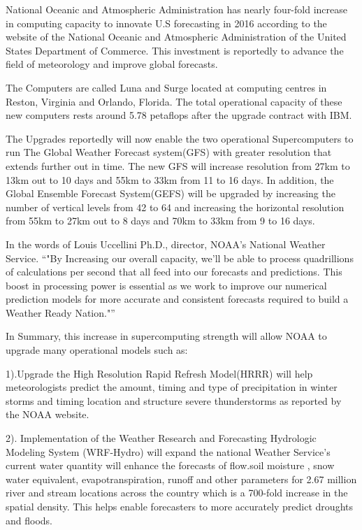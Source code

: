 \documentclass[fleqn,letterpaper,12pt]{report}
\begin{document}
%
\newpage
{}
{}
\problem
National Oceanic and Atmospheric Administration has nearly four-fold increase in computing capacity to innovate U.S forecasting in 2016 according to the website of the National Oceanic and Atmospheric Administration of the United States Department of Commerce. This investment is reportedly to advance the field of meteorology and improve global forecasts.

The Computers are called Luna and Surge located at computing centres in Reston, Virginia and Orlando, Florida. The total operational capacity of these new computers rests around 5.78 petaflops after the upgrade contract with IBM.\cite{latest}

The Upgrades reportedly will now enable the two operational Supercomputers to run The Global Weather Forecast system(GFS) with greater resolution that extends further out in time. The new GFS will increase resolution from 27km to 13km out to 10 days and 55km to 33km from 11 to 16 days. In addition, the Global Ensemble Forecast System(GEFS) will be upgraded by increasing the number of vertical levels from 42 to 64 and increasing the horizontal resolution from 55km to 27km out to 8 days and 70km to 33km from 9 to 16 days. 


In the words of Louis Uccellini Ph.D., director, NOAA’s National Weather Service. “"By Increasing our overall capacity, we’ll be able to process quadrillions of calculations per second that all feed into our forecasts and predictions. This boost in processing power is essential as we work to improve our numerical prediction models for more accurate and consistent forecasts required to build a Weather Ready Nation."”\cite{NOAA}

In Summary, this increase in supercomputing strength will allow NOAA to upgrade many operational models such as:

1).Upgrade the High Resolution Rapid Refresh Model(HRRR) will help meteorologists predict the amount, timing and type of precipitation in winter storms and timing location and structure severe thunderstorms as reported by the NOAA website.

2). Implementation of the Weather Research and Forecasting Hydrologic Modeling System (WRF-Hydro) will expand the national Weather Service’s current water quantity will enhance the forecasts of flow.soil moisture , snow water equivalent, evapotranspiration, runoff and other parameters for 2.67 million river and stream locations across the country which is a 700-fold increase in the spatial density. This helps enable forecasters to more accurately predict droughts and floods.
\end{document}

